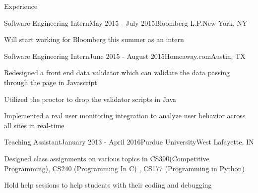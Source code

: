 \documentclass{resume} %
\begin{document}
\begin{rSection}{Experience}

\begin{rSubsection}{Software Engineering Intern}{May 2015 - July 2015}{Bloomberg L.P.}{New York, NY}
\item Will start working for Bloomberg this summer as an intern
\end{rSubsection}

\begin{rSubsection}{Software Engineering Intern}{June 2015 - August 2015}{Homeaway.com}{Austin, TX}
\item Redesigned a front end data validator which can validate the data passing through the page in Javascript
\item Utilized the proctor to drop the validator scripts  in Java
\item Implemented a real user monitoring integration to analyze user behavior across all sites in real-time  
\end{rSubsection}

\begin{rSubsection}{Teaching Assistant}{January 2013 - April 2016}{Purdue University}{West Lafayette, IN}
\item Designed class assignments on various topics in CS390(Competitive Programming), CS240 (Programming In C) , CS177 (Programming in Python) 
\item Hold help sessions to help students with their coding and debugging
\end{rSubsection}


\end{rSection}


\end{document}
